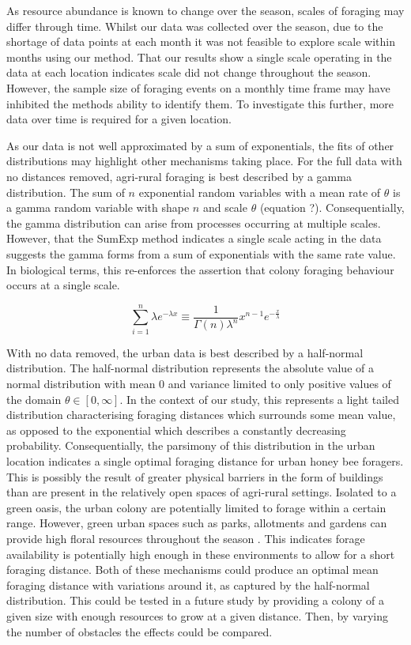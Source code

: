 \documentclass[11pt,usenames,dvipsnames]{article}
\begin{document}
As resource abundance is known to change over the season, scales of foraging may differ through time. Whilst our data was collected over the season, due to the shortage of data points at each month it was not feasible to explore scale within months using our method. That our results show a single scale operating in the data at each location indicates scale did not change throughout the season. However, the sample size of foraging events on a monthly time frame may have inhibited the methods ability to identify them. To investigate this further, more data over time is required for a given location.

As our data is not well approximated by a sum of exponentials, the fits of other distributions may highlight other mechanisms taking place. For the full data with no distances removed, agri-rural foraging is best described by a gamma distribution. The sum of $n$ exponential random variables with a mean rate of $\theta$ is a gamma random variable with shape $n$ and scale $\theta$ (equation ?). Consequentially, the gamma distribution can arise from processes occurring at multiple scales. However, that the SumExp method indicates a single scale acting in the data suggests the gamma forms from a sum of exponentials with the same rate value. In biological terms, this re-enforces the assertion that colony foraging behaviour occurs at a single scale.

\begin{equation}
\sum_{i=1}^{n} \lambda e^{-\lambda x} \equiv \frac{1}{\Gamma(n)\lambda^n}x^{n-1}e^{-\frac{x}{\lambda}}
\end{equation}

With no data removed, the urban data is best described by a half-normal distribution. The half-normal distribution represents the absolute value of a normal distribution with mean 0 and variance limited to only positive values of the domain $\theta \in [0,\infty] $. In the context of our study, this represents a light tailed distribution characterising foraging distances which surrounds some mean value, as opposed to the exponential which describes a constantly decreasing probability. Consequentially, the parsimony of this distribution in the urban location indicates a single optimal foraging distance for urban honey bee foragers. This is possibly the result of greater physical barriers in the form of buildings than are present in the relatively open spaces of agri-rural settings. Isolated to a green oasis, the urban colony are potentially limited to forage within a certain range. However, green urban spaces such as parks, allotments and gardens can provide high floral resources throughout the season \citep{Baldock2015, Baldock2019, Plascencia2017}. This indicates forage availability is potentially high enough in these environments to allow for a short foraging distance. Both of these mechanisms could produce an optimal mean foraging distance with variations around it, as captured by the half-normal distribution. This could be tested in a future study by providing a colony of a given size with enough resources to grow at a given distance. Then, by varying the number of obstacles the effects could be compared. 
\end{document}
